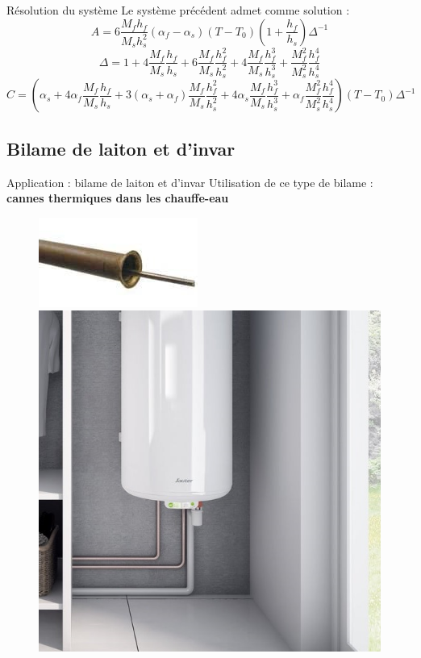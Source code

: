 \begin{frame}{Résolution du système}
    Le système précédent admet comme solution :
    $$A = 6\frac{M_fh_f}{M_sh_{s}^{2}}(\alpha_f-\alpha_s)(T-T_0)(1+\frac{h_f}{h_s})\Delta^{-1}$$
    $$\Delta = 1+4\frac{M_f}{M_s}\frac{h_f}{h_s}+6\frac{M_f}{M_s}\frac{h_f^2}{h_s^2}+4\frac{M_f}{M_s}\frac{h_f^3}{h_s^3}+\frac{M_f^2}{M_s^2}\frac{h_f^4}{h_s^4}$$
    $$C = (\alpha_s+4\alpha_f\frac{M_f}{M_s}\frac{h_f}{h_s}+3(\alpha_s+\alpha_f)\frac{M_f}{M_s}\frac{h_f^2}{h_s^2}+4\alpha_s\frac{M_f}{M_s}\frac{h_f^3}{h_s^3}+\alpha_f\frac{M_f^2}{M_s^2}\frac{h_f^4}{h_s^4})(T-T_0)\Delta^{-1}$$
\end{frame}

\subsection{Bilame de laiton et d'invar}

\begin{frame}{Application : bilame de laiton et d'invar}
    Utilisation de ce type de bilame : \textbf{cannes thermiques dans les chauffe-eau}
    \begin{figure}
        \centering
        \includegraphics[scale=0.7]{imgs/canne_thermique.jpg}
        \includegraphics[scale=0.5]{imgs/chauffe_eau.jpg}
    \end{figure}
    
\end{frame}

